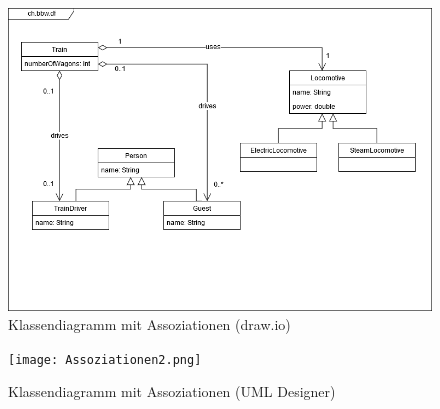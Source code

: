 \documentclass[a4paper, titlepage]{scrartcl}
\begin{document}
    \begin{figure}
        \includegraphics[width=\textwidth]{Assoziationen.png}
        \caption{Klassendiagramm mit Assoziationen (draw.io)}
        \label{AssoziationenDrawIO}
    \end{figure}
    \begin{figure}
        \texttt{[image: Assoziationen2.png]}
        \caption{Klassendiagramm mit Assoziationen (UML Designer)}
        \label{AssoziationenUmlDesigner}
    \end{figure}
\end{document}
